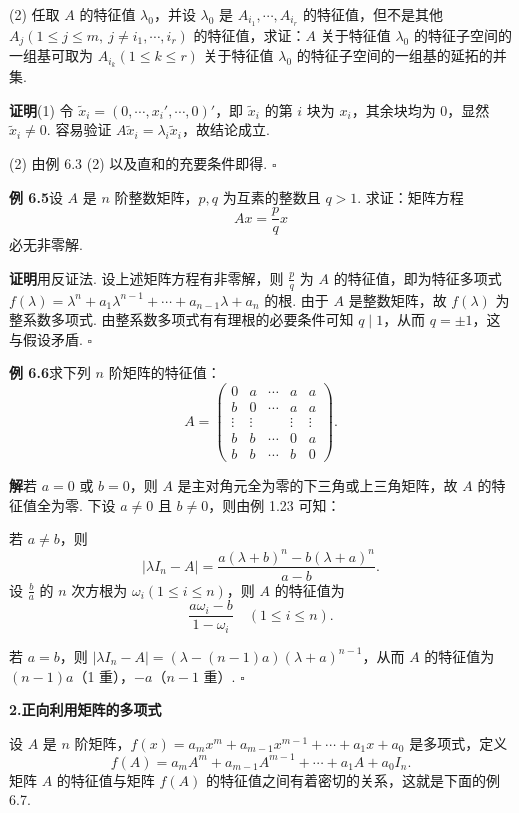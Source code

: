 \documentclass[UTF8, 12pt, fontset=fandol, oneside]{ctexart}
\begin{document}
(2) 任取 $A$ 的特征值 $\lambda_0$，并设 $\lambda_0$ 是 $A_{i_1},\cdots,A_{i_r}$ 的特征值，但不是其他 $A_j(1\le j\le m,\ j\ne i_1,\cdots,i_r)$ 的特征值，求证：$A$ 关于特征值 $\lambda_0$ 的特征子空间的一组基可取为 $A_{i_k}(1\le k\le r)$ 关于特征值 $\lambda_0$ 的特征子空间的一组基的延拓的并集.

\noindent\textbf{证明}\quad (1) 令 $\widetilde{x}_i=(0,\cdots,x_i',\cdots,0)'$，即 $\widetilde{x}_i$ 的第 $i$ 块为 $x_i$，其余块均为 $0$，显然 $\widetilde{x}_i\ne 0$. 容易验证 $A\widetilde{x}_i=\lambda_i\widetilde{x}_i$，故结论成立.

(2) 由例 6.3 (2) 以及直和的充要条件即得. $\square$

\noindent\textbf{例 6.5}\quad 设 $A$ 是 $n$ 阶整数矩阵，$p,q$ 为互素的整数且 $q>1$. 求证：矩阵方程
\[
Ax=\frac{p}{q}x
\]
必无非零解.

\noindent\textbf{证明}\quad 用反证法. 设上述矩阵方程有非零解，则 $\frac{p}{q}$ 为 $A$ 的特征值，即为特征多项式 $f(\lambda)=\lambda^n+a_1\lambda^{n-1}+\cdots+a_{n-1}\lambda+a_n$ 的根. 由于 $A$ 是整数矩阵，故 $f(\lambda)$ 为整系数多项式. 由整系数多项式有有理根的必要条件可知 $q\mid 1$，从而 $q=\pm 1$，这与假设矛盾. $\square$

\noindent\textbf{例 6.6}\quad 求下列 $n$ 阶矩阵的特征值：
\[
A=\left(\begin{array}{ccccc}
0 & a & \cdots & a & a\\
b & 0 & \cdots & a & a\\
\vdots & \vdots & & \vdots & \vdots\\
b & b & \cdots & 0 & a\\
b & b & \cdots & b & 0
\end{array}\right).
\]

\noindent\textbf{解}\quad 若 $a=0$ 或 $b=0$，则 $A$ 是主对角元全为零的下三角或上三角矩阵，故 $A$ 的特征值全为零. 下设 $a\ne 0$ 且 $b\ne 0$，则由例 1.23 可知：

若 $a\ne b$，则
\[
|\lambda I_n-A|=\frac{a(\lambda+b)^n-b(\lambda+a)^n}{a-b}.
\]
设 $\frac{b}{a}$ 的 $n$ 次方根为 $\omega_i(1\le i\le n)$，则 $A$ 的特征值为
\[
\frac{a\omega_i-b}{1-\omega_i}\quad (1\le i\le n).
\]

若 $a=b$，则 $|\lambda I_n-A|=(\lambda-(n-1)a)(\lambda+a)^{n-1}$，从而 $A$ 的特征值为 $(n-1)a$（1 重），$-a$（$n-1$ 重）. $\square$

\noindent\textbf{2.\quad 正向利用矩阵的多项式}

设 $A$ 是 $n$ 阶矩阵，$f(x)=a_mx^m+a_{m-1}x^{m-1}+\cdots+a_1x+a_0$ 是多项式，定义
\[
f(A)=a_mA^m+a_{m-1}A^{m-1}+\cdots+a_1A+a_0I_n.
\]
矩阵 $A$ 的特征值与矩阵 $f(A)$ 的特征值之间有着密切的关系，这就是下面的例 6.7.
\end{document}
